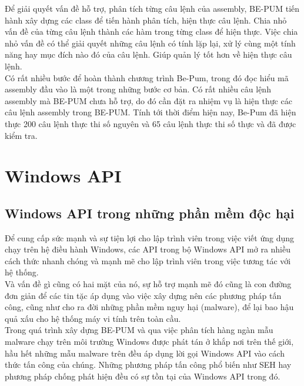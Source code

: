 Để giải quyết vấn đề hỗ trợ, phân tích từng câu lệnh của assembly, BE-PUM tiến hành xây dựng các class để tiến hành phân tích, hiện thực câu lệnh. Chia nhỏ vấn đề của từng câu lệnh thành các hàm trong từng class để hiện thực. Việc chia nhỏ vấn đề có thể giải quyết những câu lệnh có tính lặp lại, xử lý cùng một tính năng hay mục đích nào đó của câu lệnh. Giúp quản lý tốt hơn về hiện thực câu lệnh.\\

Có rất nhiều bước để hoàn thành chương trình Be-Pum, trong đó đọc hiểu mã assembly đầu vào là một trong những bước cơ bản. Có rất nhiều câu lệnh assembly mà BE-PUM chưa hỗ trợ, do đó cần đặt ra nhiệm vụ là hiện thực các câu lệnh assembly trong BE-PUM. Tính tới thời điểm hiện nay, Be-Pum đã hiện thực 200 câu lệnh thực thi số nguyên và 65 câu lệnh thực thi số thực và đã được kiểm tra. \\ 


\section{Windows API}
	\subsection{Windows API trong những phần mềm độc hại}

Để cung cấp sức mạnh và sự tiện lợi cho lập trình viên trong việc viết ứng dụng chạy trên hệ điều hành Windows, các API trong bộ Windows API mở ra nhiều cách thức nhanh chóng và mạnh mẽ cho lập trình viên trong việc tương tác với hệ thống.\\

Và vấn đề gì cũng có hai mặt của nó, sự hỗ trợ mạnh mẽ đó cũng là con đường đơn giản để các tin tặc áp dụng vào việc xây dựng nên các phương pháp tấn công, cũng như cho ra đời những phần mềm nguy hại (malware), để lại bao hậu quả xấu cho hệ thống máy vi tính trên toàn cầu.\\

Trong quá trình xây dựng BE-PUM và qua việc phân tích hàng ngàn mẫu malware chạy trên môi trường Windows được phát tán ở khắp nơi trên thế giới, hầu hết những mẫu malware trên đều áp dụng lời gọi Windows API vào cách thức tấn công của chúng. Những phương pháp tấn công phổ biến như SEH hay phương pháp chống phát hiện đều có sự tồn tại của Windows API trong đó.\\

